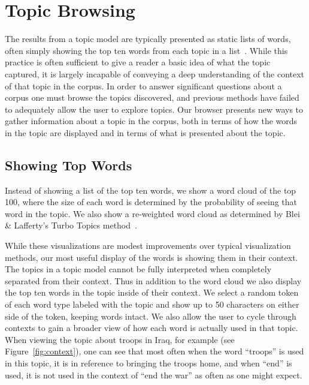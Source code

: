 \documentclass{article}
\begin{document}
\section{Topic Browsing}

The results from a topic model are typically presented as static lists of
words, often simply showing the top ten words from each topic in a
list~\cite{blei-2003-latent-dirichlet-allocation}.  While this practice is
often sufficient to give a reader a basic idea of what the topic captured, it
is largely incapable of conveying a deep understanding of the context of that
topic in the corpus.  In order to answer significant questions about a corpus
one must browse the topics discovered, and previous methods have failed to
adequately allow the user to explore topics.  Our browser presents new ways to
gather information about a topic in the corpus, both in terms of how the words
in the topic are displayed and in terms of what is presented about the topic.

\subsection{Showing Top Words}

Instead of showing a list of the top ten words, we show a word cloud of the top
100, where the size of each word is determined by the probability of seeing
that word in the topic.  We also show a re-weighted word cloud as determined by
Blei \& Lafferty's Turbo Topics method~\cite{blei-2009-turbo-topics}.

While these visualizations are modest improvements over typical visualization
methods, our most useful display of the words is showing them in their context.
The topics in a topic model cannot be fully interpreted when completely
separated from their context.  Thus in addition to the word cloud we also
display the top ten words in the topic inside of their context.  We select a
random token of each word type labeled with the topic and show up to 50
characters on either side of the token, keeping words intact.  We also allow
the user to cycle through contexts to gain a broader view of how each word is
actually used in that topic.  When viewing the topic about troops in Iraq, for
example (see Figure~\ref{fig:context}), one can see that most often when the
word ``troops'' is used in this topic, it is in reference to bringing the
troops home, and when ``end'' is used, it is not used in the context of ``end
the war'' as often as one might expect.
\end{document}
